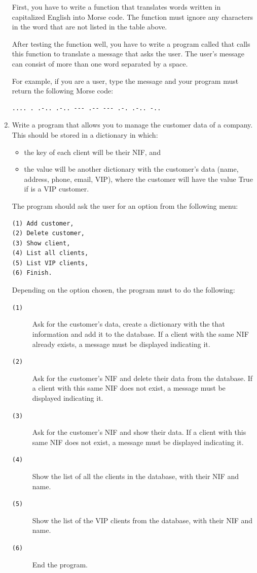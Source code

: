 \documentclass[
  fontsize=10pt,
  a4paper,
]{scrartcl}
\begin{document}
\begin{enumerate}
First, you have to write a function that translates words written in capitalized English into Morse code. The function must ignore any characters in the word that are not listed in the table above.

After testing the function well, you have to write a program called  that calls this function to translate a message that asks the user. The user's message can consist of more than one word separated by a space.

For example, if you are a user, type the message  and your program must return the following Morse code:

\begin{verbatim}
.... . .-.. .-.. --- .-- --- .-. .-.. -..
\end{verbatim}

 
\item Write a program that allows you to manage the customer data of a company. This should be stored in a dictionary in which:

\begin{itemize}
\item the key of each client will be their NIF, and
\item the value will be another dictionary with the customer's data (name, address, phone, email, VIP), where the customer will have the value True if is a VIP customer.
\end{itemize}

The program should ask the user for an option from the following menu:

\begin{verbatim}
(1) Add customer,
(2) Delete customer,
(3) Show client,
(4) List all clients,
(5) List VIP clients,
(6) Finish.
\end{verbatim}

Depending on the option chosen, the program must to do the following:
\begin{description}
    \item[\verb|(1)|] Ask for the customer's data, create a dictionary with the that information and add it to the database. If a client with the same NIF already exists, a message must be displayed indicating it.
    \item[\verb|(2)|] Ask for the customer's NIF and delete their data from the database. If a client with this same NIF does not exist, a message must be displayed indicating it.
    \item[\verb|(3)|] Ask for the customer's NIF and show their data. If a client with this same NIF does not exist, a message must be displayed indicating it.
    \item[\verb|(4)|] Show the list of all the clients in the database, with their NIF and name.
    \item[\verb|(5)|] Show the list of the VIP clients from the database, with their NIF and name.
    \item[\verb|(6)|] End the program.
\end{description}


\end{enumerate}
\end{document}
